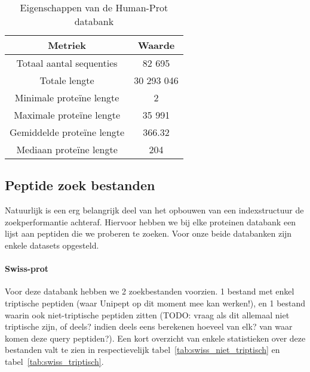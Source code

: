 \documentclass[11pt,dutch,faculty=we,layout=titlefont,underline=false,titleUppercase=true,titleUnderline=true]{ugent2016-report}
\begin{document}
    \begin{table}[h!]
        \centering
        \begin{tabular}{ c c }
            Metriek                    & Waarde     \\
            \hline\hline
            Totaal aantal sequenties   & 82 695     \\
            Totale lengte              & 30 293 046 \\
            Minimale proteïne lengte   & 2          \\
            Maximale proteïne lengte   & 35 991     \\
            Gemiddelde proteïne lengte & 366.32     \\
            Mediaan proteïne lengte    & 204        \\
            \hline
        \end{tabular}
        \caption{Eigenschappen van de Human-Prot databank}
        \label{tab:humanprot_eigenschappen}
    \end{table}

    \subsection{Peptide zoek bestanden}\label{subsec:peptide-zoek-bestanden}
    Natuurlijk is een erg belangrijk deel van het opbouwen van een indexstructuur de zoekperformantie achteraf.
    Hiervoor hebben we bij elke proteinen databank een lijst aan peptiden die we proberen te zoeken.
    Voor onze beide databanken zijn enkele datasets opgesteld.

    \paragraph{Swiss-prot} Voor deze databank hebben we 2 zoekbestanden voorzien.
    1 bestand met enkel triptische peptiden (waar Unipept op dit moment mee kan werken!), en 1 bestand waarin ook niet-triptische peptiden zitten (TODO: vraag als dit allemaal niet triptische zijn, of deels? indien deels eens berekenen hoeveel van elk? van waar komen deze query peptiden?).
    Een kort overzicht van enkele statistieken over deze bestanden valt te zien in respectievelijk tabel~\ref{tab:swiss_niet_triptisch} en tabel~\ref{tab:swiss_triptisch}.
\end{document}
